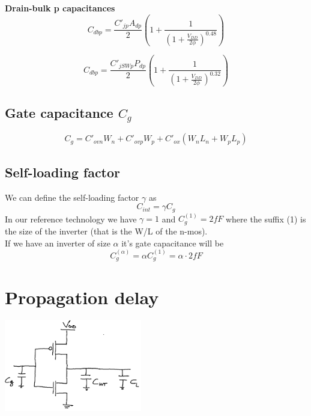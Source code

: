 \vspace{5mm}
{\bf Drain-bulk p capacitances}
\begin{equation}
C_{dbp}=\frac{C'_{jp}A_{dp}}{2}\left(1+\frac{1}{(1+\frac{V_{DD}}{2\phi})^{0.48}}  \right)
\end{equation}

\begin{equation}
C_{dbp}=\frac{C'_{jSWp}P_{dp}}{2}\left(1+\frac{1}{(1+\frac{V_{DD}}{2\phi})^{0.32}}  \right)
\end{equation}


\subsection{Gate capacitance $C_{g}$}

\begin{equation}
C_g=C'_{ovn}W_n+C'_{ovp}W_p+C'_{ox}(W_nL_n+W_pL_p)
\end{equation}

\subsection{Self-loading factor}
We can define the self-loading factor $\gamma$ as 
\begin{equation}
C_{int}=\gamma C_g
\end{equation}
In our reference technology we have $\gamma=1$ and $C_g^{(1)}=2fF$ where the suffix (1) is the size of the inverter (that is the W/L of the n-mos).\\
If we have an inverter of size $\alpha$ it's gate capacitance will be 
\begin{equation}
C_g^{(\alpha)}=\alpha C_g^{(1)}=\alpha\cdot 2fF
\end{equation}


\section{Propagation delay}
\centering
\includegraphics[width=0.45\textwidth]{C3_10.png}\\
\raggedright

